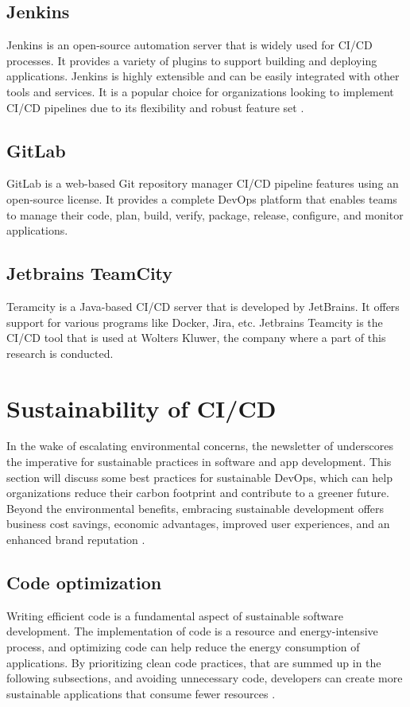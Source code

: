\subsection{Jenkins}
Jenkins is an open-source automation server that is widely used for CI/CD processes. It provides a variety of plugins to support building and deploying applications. 
Jenkins is highly extensible and can be easily integrated with other tools and services. 
It is a popular choice for organizations looking to implement CI/CD pipelines due to its flexibility and robust feature set \autocite{Hat2023}.


\subsection{GitLab}
GitLab is a web-based Git repository manager CI/CD pipeline features using an open-source license.
It provides a complete DevOps platform that enables teams to manage their code, plan, build, verify, package, release, configure, and monitor applications.


\subsection{Jetbrains TeamCity}
Teramcity is a Java-based CI/CD server that is developed by JetBrains. It offers support for various programs like Docker, Jira, etc.
Jetbrains Teamcity is the CI/CD tool that is used at Wolters Kluwer, the company where a part of this research is conducted.



\section{Sustainability of CI/CD}
In the wake of escalating environmental concerns, the newsletter of \textcite{Corewave2023} underscores the imperative for sustainable practices in software and app development.
This section will discuss some best practices for sustainable DevOps, which can help organizations reduce their carbon footprint and contribute to a greener future.
Beyond the environmental benefits, embracing sustainable development offers business cost savings, economic advantages, improved user experiences, and an enhanced brand reputation \autocite{Corewave2023}.


\subsection{Code optimization}
Writing efficient code is a fundamental aspect of sustainable software development. 
The implementation of code is a resource and energy-intensive process, and optimizing code can help reduce the energy consumption of applications.
By prioritizing clean code practices, that are summed up in the following subsections, and avoiding unnecessary code, developers can create more sustainable applications that consume fewer resources \autocite{Corewave2023}.

